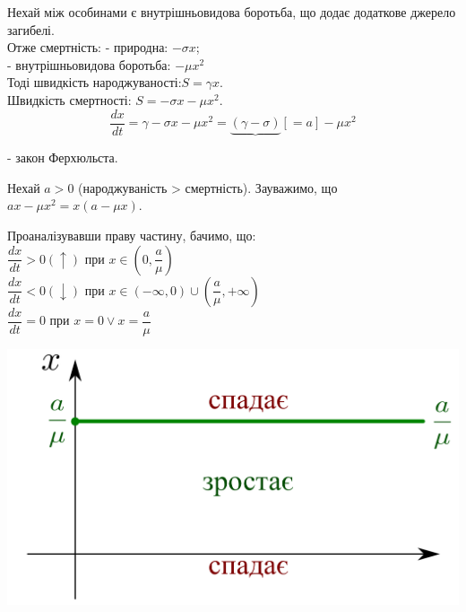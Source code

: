 Нехай між особинами є внутрішньовидова боротьба, що додає додаткове джерело загибелі.\\
Отже смертність: - природна:  $-\sigma x$;\\
\hspace*{4.01cm}- внутрішньовидова боротьба: $- \mu x^2$\\
Тоді швидкість народжуваності:$S = \gamma x$.\\
Швидкість смертності:  $ S = - \sigma x - \mu x^2$.\\
$$
\frac{dx}{dt}  = \gamma -  \sigma x - \mu x^2 = \underbrace{(\gamma - \sigma)}[=a] - \mu x^2
$$

\begin{center}
     - закон Ферхюльста.
\end{center}
Нехай $a > 0$ (народжуваність > смертність).  Зауважимо, що $ax - \mu x^2 = x ( a - \mu x)$.

Проаналізувавши праву частину, бачимо, що:\\
$
\dfrac{dx}{dt} > 0 (\uparrow) \text{ при } x \in (0, \dfrac{a}{\mu} )
$\\
$
\dfrac{dx}{dt} < 0 (\downarrow) \text{ при } x \in (- \infty, 0) \cup ( \dfrac{a}{\mu},  +\infty)
$\\
$
\dfrac{dx}{dt} = 0 \text{ при } x = 0 \lor x = \dfrac{a}{\mu}
$\\


\begin{center} \includegraphics[scale=0.3]{assets/lectures_recent-e4b7cd02.png} \end{center}


